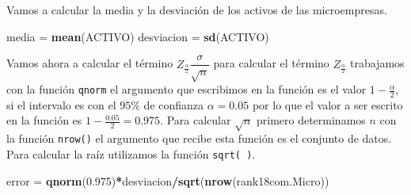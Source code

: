 \documentclass[letterpaper,]{book}
\newenvironment{Shaded}{\begin{snugshade}}{\end{snugshade}}
\newcommand{\DataTypeTok}[1]{\textcolor[rgb]{0.13,0.29,0.53}{#1}}
\newcommand{\FloatTok}[1]{\textcolor[rgb]{0.00,0.00,0.81}{#1}}
\newcommand{\KeywordTok}[1]{\textcolor[rgb]{0.13,0.29,0.53}{\textbf{#1}}}
\newcommand{\NormalTok}[1]{#1}
\newcommand{\OperatorTok}[1]{\textcolor[rgb]{0.81,0.36,0.00}{\textbf{#1}}}
\newcommand{\OtherTok}[1]{\textcolor[rgb]{0.56,0.35,0.01}{#1}}
\newcommand{\StringTok}[1]{\textcolor[rgb]{0.31,0.60,0.02}{#1}}
\begin{document}
\begin{Shaded}
\end{Shaded}

Vamos a calcular la media y la desviación de los activos de las microempresas.

\begin{Shaded}
\begin{Highlighting}[]
\NormalTok{media =}\StringTok{ }\KeywordTok{mean}\NormalTok{(ACTIVO)}
\NormalTok{desviacion =}\StringTok{ }\KeywordTok{sd}\NormalTok{(ACTIVO)}
\end{Highlighting}
\end{Shaded}

Vamos ahora a calcular el término \(Z_{\frac{\alpha}{2}}\dfrac{\sigma}{\sqrt{n}}\) para calcular el término \(Z_{\frac{\alpha}{2}}\) trabajamos con la función \texttt{qnorm} el argumento que escribimos en la función es el valor \(1-\frac{\alpha}{2}\), si el intervalo es con el \(95\%\) de confianza \(\alpha=0.05\) por lo que el valor a ser escrito en la función es \(1-\frac{0.05}{2}=0.975\). Para calcular \(\sqrt{n}\) primero determinamos \(n\) con la función \texttt{nrow()} el argumento que recibe esta función es el conjunto de datos. Para calcular la raíz utilizamos la función \texttt{sqrt(\ )}.

\begin{Shaded}
\begin{Highlighting}[]
\NormalTok{error  =}\StringTok{ }\KeywordTok{qnorm}\NormalTok{(}\FloatTok{0.975}\NormalTok{)}\OperatorTok{*}\NormalTok{desviacion}\OperatorTok{/}\KeywordTok{sqrt}\NormalTok{(}\KeywordTok{nrow}\NormalTok{(rank18com.Micro))}
\end{Highlighting}
\end{Shaded}
\end{document}
